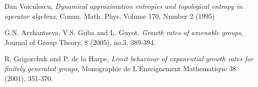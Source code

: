 \documentclass[a4paper,10pt]{amsart}
\begin{document}
\begin{thebibliography}{9}
    Dan Voiculescu,
    \emph{Dynamical approximation entropies and topological entropy 
    in operator algebras}, 
    Comm. Math. Phys. Volume 170, Number 2 (1995)

    G.N. Arzhantseva, V.S. Guba and L. Guyot. 
    \emph{Growth rates of amenable groups}, 
    Journal of Group Theory, 8 (2005), no.3, 389-394.

    R. Grigorchuk and P. de la Harpe,
    \emph{Limit behaviour of exponential growth rates for finitely generated groups}, 
    Monographie de L’Enseignement Mathematique 38 (2001), 351-370.
\end{thebibliography}
\end{document}
